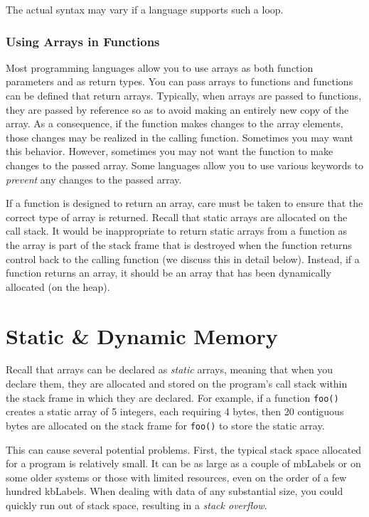 The actual syntax may vary if a language supports such a loop.

\subsubsection{Using Arrays in Functions}

Most programming languages allow you to use arrays as both function 
parameters and as return types.  You can pass arrays to
functions and functions can be defined that return arrays.  Typically, 
when arrays are passed to functions, they are passed by reference
so as to avoid making an entirely new copy of the array.  As a 
consequence, if the function makes changes to the array elements, 
those changes may be realized in the calling function.  Sometimes 
you may want this behavior.  
However, sometimes you may not want the function to make
changes to the passed array.  Some languages allow you to use 
various keywords to \emph{prevent} any changes to the passed array.

If a function is designed to return an array, care must be taken to
ensure that the correct type of array is returned.  Recall that static
arrays are allocated on the call stack.  It would be inappropriate
to return static arrays from a function as the array is part of the
stack frame that is destroyed when the function returns control
back to the calling function (we discuss this in detail below).  
Instead, if a function returns an array, it should be an array that
has been dynamically allocated (on the heap).  

\section{Static \& Dynamic Memory}
\label{section:arraysInDepth}

Recall that arrays can be declared as \emph{static} arrays,
meaning that when you declare them, they are allocated and
stored on the program's call stack within the stack frame in which
they are declared.  For example, if a function \texttt{foo()}
creates a static array of 5 integers, each requiring 4 bytes, then
20 contiguous bytes are allocated on the stack frame for 
\texttt{foo()} to store the static array.

This can cause several potential problems.  First, the typical 
stack space allocated for a program is relatively small.  It can be as
large as a couple of \glspl{mbLabel} or on some older systems or
those with limited resources, even on the order of a few hundred
\glspl{kbLabel}.  When dealing with data of any substantial
size, you could quickly run out of stack space, resulting in
a  \emph{stack overflow}. 


